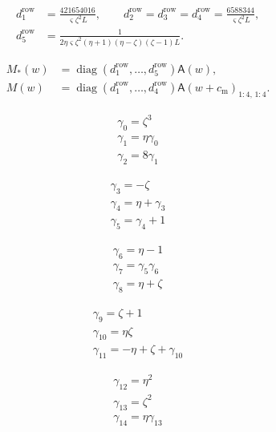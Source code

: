 
\[
\begin{aligned}
 d_{1}^{\mathrm{row}}&=\frac{421654016}{\varsigma \zeta ^2L},\qquad
 d_{2}^{\mathrm{row}}=d_{3}^{\mathrm{row}}=d_{4}^{\mathrm{row}}=\frac{6588344}{\varsigma \zeta ^2L},\\
 d_{5}^{\mathrm{row}}&=\frac{1}{2\eta \varsigma \zeta ^2(\eta +1)(\eta -\zeta )(\zeta -1)L}.
\end{aligned}
\]

\[
\begin{aligned}
 M_*(w)&=\operatorname{diag}(d_{1}^{\mathrm{row}},\ldots,d_{5}^{\mathrm{row}})\mathsf A(w),\\
 M(w)&=\operatorname{diag}(d_{1}^{\mathrm{row}},\ldots,d_{4}^{\mathrm{row}})\mathsf A(w+c_{\mathrm m})_{1:4,\,1:4}.
\end{aligned}
\]

\[\begin{aligned}\gamma_{0}=\zeta ^{3}\\ \gamma_{1}=\eta  \gamma_{0}\\ \gamma_{2}=8 \gamma_{1}\end{aligned}\]

\[\begin{aligned}\gamma_{3}=- \zeta \\ \gamma_{4}=\eta  + \gamma_{3}\\ \gamma_{5}=\gamma_{4} + 1\end{aligned}\]

\[\begin{aligned}\gamma_{6}=\eta  - 1\\ \gamma_{7}=\gamma_{5} \gamma_{6}\\ \gamma_{8}=\eta  + \zeta \end{aligned}\]

\[\begin{aligned}\gamma_{9}=\zeta  + 1\\ \gamma_{10}=\eta  \zeta \\ \gamma_{11}=- \eta  + \zeta  + \gamma_{10}\end{aligned}\]

\[\begin{aligned}\gamma_{12}=\eta ^{2}\\ \gamma_{13}=\zeta ^{2}\\ \gamma_{14}=\eta  \gamma_{13}\end{aligned}\]

